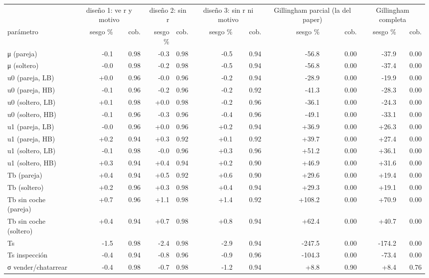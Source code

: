 \begin{tabular}{lrrrrrrrrrr}
\hline
 & \multicolumn{2}{c}{diseño 1: ve r y motivo} & \multicolumn{2}{c}{diseño 2: sin r} & \multicolumn{2}{c}{diseño 3: sin r ni motivo} & \multicolumn{2}{c}{Gillingham parcial (la del paper)} & \multicolumn{2}{c}{Gillingham completa} \\
parámetro & sesgo \% & cob. & sesgo \% & cob. & sesgo \% & cob. & sesgo \% & cob. & sesgo \% & cob. \\
\hline
μ (pareja) & -0.1 & 0.98 & -0.3 & 0.98 & -0.5 & 0.94 & -56.8 & 0.00 & -37.9 & 0.00 \\
μ (soltero) & -0.0 & 0.98 & -0.2 & 0.98 & -0.5 & 0.94 & -56.8 & 0.00 & -37.4 & 0.00 \\
u0 (pareja, LB) & +0.0 & 0.96 & -0.0 & 0.96 & -0.2 & 0.94 & -28.9 & 0.00 & -19.9 & 0.00 \\
u0 (pareja, HB) & -0.1 & 0.96 & -0.2 & 0.96 & -0.2 & 0.92 & -41.3 & 0.00 & -28.3 & 0.00 \\
u0 (soltero, LB) & +0.1 & 0.98 & +0.0 & 0.98 & -0.2 & 0.96 & -36.1 & 0.00 & -24.3 & 0.00 \\
u0 (soltero, HB) & -0.1 & 0.96 & -0.3 & 0.96 & -0.4 & 0.96 & -49.1 & 0.00 & -33.1 & 0.00 \\
u1 (pareja, LB) & -0.0 & 0.96 & +0.0 & 0.96 & +0.2 & 0.94 & +36.9 & 0.00 & +26.3 & 0.00 \\
u1 (pareja, HB) & +0.2 & 0.94 & +0.3 & 0.92 & +0.1 & 0.92 & +39.7 & 0.00 & +27.4 & 0.00 \\
u1 (soltero, LB) & -0.1 & 0.98 & -0.0 & 0.96 & +0.3 & 0.96 & +51.2 & 0.00 & +36.1 & 0.00 \\
u1 (soltero, HB) & +0.3 & 0.94 & +0.4 & 0.94 & +0.2 & 0.90 & +46.9 & 0.00 & +31.6 & 0.00 \\
Tb (pareja) & +0.4 & 0.94 & +0.5 & 0.92 & +0.6 & 0.90 & +29.6 & 0.00 & +19.4 & 0.00 \\
Tb (soltero) & +0.2 & 0.96 & +0.3 & 0.98 & +0.4 & 0.94 & +29.3 & 0.00 & +19.1 & 0.00 \\
Tb sin coche (pareja) & +0.7 & 0.96 & +1.1 & 0.98 & +1.4 & 0.92 & +108.2 & 0.00 & +70.9 & 0.00 \\
Tb sin coche (soltero) & +0.4 & 0.94 & +0.7 & 0.98 & +0.8 & 0.94 & +62.4 & 0.00 & +40.7 & 0.00 \\
Ts & -1.5 & 0.98 & -2.4 & 0.98 & -2.9 & 0.94 & -247.5 & 0.00 & -174.2 & 0.00 \\
Ts inspección & -0.4 & 0.94 & -0.8 & 0.96 & -0.9 & 0.96 & -104.3 & 0.00 & -73.4 & 0.00 \\
σ vender/chatarrear & -0.4 & 0.98 & -0.7 & 0.98 & -1.2 & 0.94 & +8.8 & 0.90 & +8.4 & 0.76 \\

\end{tabular}
